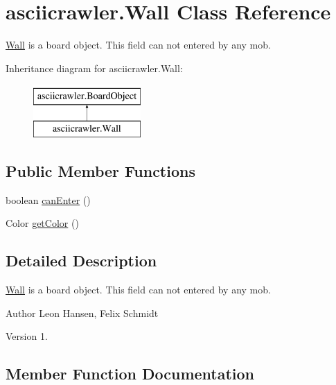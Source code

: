 \hypertarget{classasciicrawler_1_1Wall}{}\section{asciicrawler.\+Wall Class Reference}
\label{classasciicrawler_1_1Wall}


\hyperlink{classasciicrawler_1_1Wall}{Wall} is a board object. This field can not entered by any mob.  


Inheritance diagram for asciicrawler.\+Wall\+:\begin{figure}[H]
\begin{center}
\leavevmode
\includegraphics[height=2.000000cm]{classasciicrawler_1_1Wall}
\end{center}
\end{figure}
\subsection*{Public Member Functions}
\begin{DoxyCompactItemize}
\item 
boolean \hyperlink{classasciicrawler_1_1Wall_a02f8695f9861d61b9d2c3af3a185e522}{can\+Enter} ()
\item 
Color \hyperlink{classasciicrawler_1_1Wall_a357f77acaa033e6d59b5973459954bb8}{get\+Color} ()
\end{DoxyCompactItemize}


\subsection{Detailed Description}
\hyperlink{classasciicrawler_1_1Wall}{Wall} is a board object. This field can not entered by any mob. 

\begin{DoxyAuthor}{Author}
Leon Hansen, Felix Schmidt 
\end{DoxyAuthor}
\begin{DoxyVersion}{Version}
1. 
\end{DoxyVersion}


\subsection{Member Function Documentation}
\mbox{\label{classasciicrawler_1_1Wall_a02f8695f9861d61b9d2c3af3a185e522}} 
